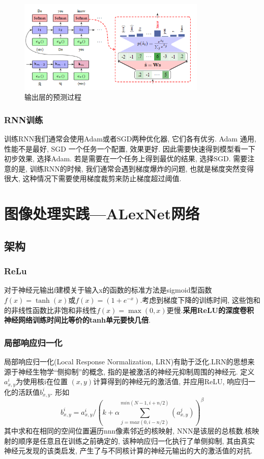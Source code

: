 \documentclass[a4paper]{article}
\theoremstyle{definition}
\numberwithin{equation}{section}
\begin{document}
    \begin{figure}[htp]
        \centering
        \includegraphics[width=0.8\textwidth]{outputpredict.png}
        \caption{输出层的预测过程} 
        \end{figure}

\subsubsection{RNN训练}
训练RNN我们通常会使用Adam或者SGD两种优化器, 它们各有优劣. Adam 通用, 性能不是最好, SGD  一个任务一个配置, 效果更好. 
因此需要快速得到模型看一下初步效果, 选择Adam. 
若是需要在一个任务上得到最优的结果, 选择SGD. 
需要注意的是, 训练RNN的时候, 我们通常会遇到梯度爆炸的问题, 也就是梯度突然变得很大, 这种情况下需要使用梯度裁剪来防止梯度超过阈值. 

\section{图像处理实践---ALexNet网络}
 
\subsection{架构}
\subsubsection{ReLu}
对于神经元输出f建模关于输入x的函数的标准⽅法是sigmoid型函数$f(x)=\tanh(x)$或$f(x)=(1+e^{-x})$.考虑到梯度下降的训练时间, 这些饱和的非线性函数比非饱和非线性$f(x)=\max(0, x)$更慢.\textbf{采用ReLU的深度卷积神经网络训练时间比等价的tanh单元要快几倍}.

\subsubsection{局部响应归一化}

局部响应归一化(Local Response Normalization, LRN)有助于泛化.LRN的思想来源于神经生物学“侧抑制”的概念, 指的是被激活的神经元抑制周围的神经元. 
定义$a_{x, y}^i$为使用核i在位置 $(x, y)$计算得到的神经元的激活值, 并应用ReLU, 响应归一化的活跃值$b_{x, y}^i $. 形如
$$b_{x, y}^i = a_{x, y}^i/(k + \alpha\sum_{j = max(0,  i-n/2)}^{min(N-1,  i + n/2)}(a_{x, y}^j))^\beta$$
其中求和在相同的空间位置遍历nnn像素邻近的核映射, NNN是该层的总核数.核映射的顺序是任意且在训练之前确定的, 该种响应归一化执行了单侧抑制, 其由真实神经元发现的该类启发, 产生了与不同核计算的神经元输出的大的激活值的对抗. 
\end{document}
